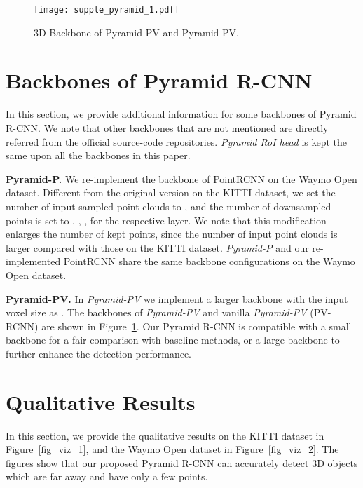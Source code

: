 \documentclass[10pt,twocolumn,letterpaper]{article}
\begin{document}
\begin{figure}[!t]
\centering
\texttt{[image: supple\_pyramid\_1.pdf]}
\caption{3D Backbone of Pyramid-PV and Pyramid-PV.}
\label{fig_backbone}
\vspace{-3mm}
\end{figure}

\section{Backbones of Pyramid R-CNN}
In this section, we provide additional information for some backbones of Pyramid R-CNN. We note that other backbones that are not mentioned are directly referred from the official source-code repositories. \textit{Pyramid RoI head} is kept the same upon all the backbones in this paper.

\textbf{Pyramid-P.} We re-implement the backbone of PointRCNN on the Waymo Open dataset. Different from the original version on the KITTI dataset, we set the number of input sampled point clouds to , and the number of downsampled points is set to , , ,  for the respective layer. We note that this modification enlarges the number of kept points, since the number of input point clouds is larger compared with those on the KITTI dataset. \textit{Pyramid-P} and our re-implemented PointRCNN share the same backbone configurations on the Waymo Open dataset.    

\textbf{Pyramid-PV.} In \textit{Pyramid-PV} we implement a larger backbone with the input voxel size as . The backbones of \textit{Pyramid-PV} and vanilla \textit{Pyramid-PV} (PV-RCNN) are shown in Figure~\ref{fig_backbone}. Our Pyramid R-CNN is compatible with a small backbone for a fair comparison with baseline methods, or a large backbone to further enhance the detection performance.

\section{Qualitative Results}
In this section, we provide the qualitative results on the KITTI dataset in Figure~\ref{fig_viz_1}, and the Waymo Open dataset in Figure~\ref{fig_viz_2}. The figures show that our proposed Pyramid R-CNN can accurately detect 3D objects which are far away and have only a few points.  

\begin{figure*}[!t] \centering   
{}    
\caption{Visualization of detection results on the KITTI dataset. Blue boxes are the ground truth boxes, and red boxes are the boxes predicted by \textit{Pyramid-PV}.}     
\label{fig_viz_1} 
\end{figure*}
\end{document}
